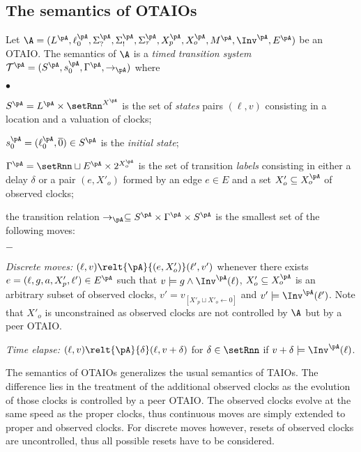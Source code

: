 \documentclass{LMCS}
\theoremstyle{plain}\newtheorem{proposition}[thm]{Proposition}
\begin{document}
\subsection{The semantics of OTAIOs}
Let
$\A=(L^\pA,\ell_0^\pA,\Sigma_?^\pA,\Sigma_!^\pA,\Sigma_\tau^\pA,X_p^\pA,X_o^\pA,M^\pA,\Inv^\pA,E^\pA)$ be an OTAIO.
The semantics of $\A$ is a {\it timed transition system}
$\mathcal{T}^{\pA}=(S^\pA,s_0^\pA,\Gamma^\pA,\rightarrow_\pA)$ 
where
\begin{iteMize}{$\bullet$}
\item 
$S^\pA=L^\pA \times \setRnn^{X^\pA}$ is the set of {\em states} \ie
pairs $(\ell,v)$ consisting in a location and a valuation of clocks;
\item $s_0^\pA=(\ell_0^\pA,\overline{0}) \in S^\pA$ is the {\em initial state}; 
\item 
$\Gamma^\pA=\setRnn \sqcup E^\pA \times 2^{X_o^\pA}$ is the set of transition {\em labels}
consisting in either a delay $\delta$ or a pair  $(e,X'_o)$ formed by 
an edge $e \in E$ and a set $X_o' \subseteq X_o^\pA$ of observed clocks;
\item 
the  transition relation 
$\rightarrow_\pA \subseteq S^\pA \times \Gamma^\pA \times S^\pA$ is the smallest set of the following moves:
\begin{iteMize}{$-$}
\item
{\em Discrete moves:} 
$(\ell,v) \relt{\pA}{(e,X'_o)} (\ell',v')$ 
whenever there exists $e=(\ell,g,a,X'_p,\ell') \in E^\pA$ 
such that $v \models g \wedge \Inv^\pA(\ell)$, 
$X_o' \subseteq X_o^\pA$ is an arbitrary subset of observed clocks, 
$v'=v_{[X'_p\sqcup X'_o\leftarrow 0]}$ and $v' \models \Inv^\pA(\ell')$.
Note that $X'_o$ is unconstrained as observed clocks are not controlled by $\A$ but by a peer OTAIO. 
\item
{\em Time elapse:}
$(\ell,v) \relt{\pA}{\delta} (\ell,v+\delta)$
for $\delta \in \setRnn$ if  
$v + \delta\models \Inv^\pA(\ell)$.
\end{iteMize}
\end{iteMize}\medskip
The semantics of OTAIOs generalizes the usual semantics of TAIOs.
The difference lies in the treatment of the additional observed clocks
as the evolution of those clocks is controlled by a peer OTAIO.
The observed clocks evolve at the same speed as the proper clocks, 
thus continuous moves are simply extended to proper and observed clocks.
For discrete moves however, resets of observed clocks are uncontrolled,
thus all possible resets have to be considered.
\end{document}
